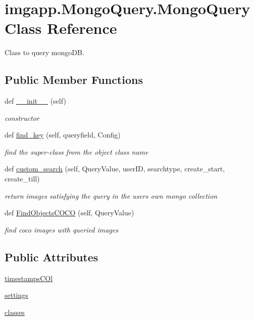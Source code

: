 \hypertarget{classimgapp_1_1MongoQuery_1_1MongoQuery}{}\section{imgapp.\+Mongo\+Query.\+Mongo\+Query Class Reference}
\label{classimgapp_1_1MongoQuery_1_1MongoQuery}


Class to query mongo\+DB.  


\subsection*{Public Member Functions}
\begin{DoxyCompactItemize}
\item 
def \hyperlink{classimgapp_1_1MongoQuery_1_1MongoQuery_a693c49ebe9e0d1f143701902a90548e2}{\+\_\+\+\_\+init\+\_\+\+\_\+} (self)
\begin{DoxyCompactList}\small\item\em constructor \end{DoxyCompactList}\item 
def \hyperlink{classimgapp_1_1MongoQuery_1_1MongoQuery_a000e9631fd10def6744745742b76b17f}{find\+\_\+key} (self, queryfield, Config)
\begin{DoxyCompactList}\small\item\em find the super-\/class from the object class name \end{DoxyCompactList}\item 
def \hyperlink{classimgapp_1_1MongoQuery_1_1MongoQuery_aa9c47cc3d970874932324bfebd976f5e}{custom\+\_\+search} (self, Query\+Value, user\+ID, searchtype, create\+\_\+start, create\+\_\+till)
\begin{DoxyCompactList}\small\item\em return images satisfying the query in the user\textquotesingle{}s own mongo collection \end{DoxyCompactList}\item 
def \hyperlink{classimgapp_1_1MongoQuery_1_1MongoQuery_a65aa8fea8d0fdebb17091e8e8ca146d5}{Find\+Objects\+C\+O\+CO} (self, Query\+Value)
\begin{DoxyCompactList}\small\item\em find coco images with queried images \end{DoxyCompactList}\end{DoxyCompactItemize}
\subsection*{Public Attributes}
\begin{DoxyCompactItemize}
\item 
\hyperlink{classimgapp_1_1MongoQuery_1_1MongoQuery_a2731bf8e3f435eaadb3cd073092eec41}{timestamps\+C\+Ol}
\item 
\hyperlink{classimgapp_1_1MongoQuery_1_1MongoQuery_ae16f317f2eee2ae039b7fe5528bba7a8}{settings}
\item 
\hyperlink{classimgapp_1_1MongoQuery_1_1MongoQuery_a6b38bf349d17270bc20067a68a881ef2}{classes}
\end{DoxyCompactItemize}
